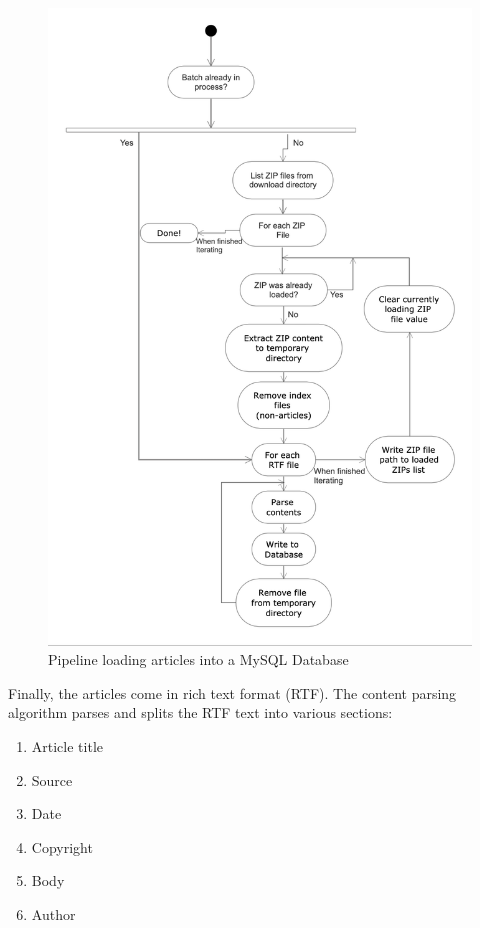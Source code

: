 \begin{figure}[h!]
      \centering
      \includegraphics[scale=0.7]{method/Screenshot 2021-04-19 at 15.12.36.png}
      \caption{Pipeline loading articles into a MySQL Database}
      \label{database loader}
\end{figure}

Finally, the articles come in rich text format (RTF). The content parsing algorithm parses and splits the RTF text into various sections:
\begin{enumerate}
    \item Article title
    \item Source
    \item Date
    \item Copyright
    \item Body
    \item Author
\end{enumerate}

